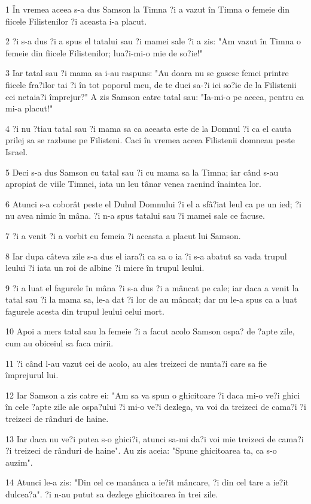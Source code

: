 \par 1 În vremea aceea s-a dus Samson la Timna ?i a vazut în Timna o femeie din fiicele Filistenilor ?i aceasta i-a placut.
\par 2 ?i s-a dus ?i a spus el tatalui sau ?i mamei sale ?i a zis: "Am vazut în Timna o femeie din fiicele Filistenilor; lua?i-mi-o mie de so?ie!"
\par 3 Iar tatal sau ?i mama sa i-au raspuns: "Au doara nu se gasesc femei printre fiicele fra?ilor tai ?i în tot poporul meu, de te duci sa-?i iei so?ie de la Filistenii cei netaia?i împrejur?" A zis Samson catre tatal sau: "Ia-mi-o pe aceea, pentru ca mi-a placut!"
\par 4 ?i nu ?tiau tatal sau ?i mama sa ca aceasta este de la Domnul ?i ca el cauta prilej sa se razbune pe Filisteni. Caci în vremea aceea Filistenii domneau peste Israel.
\par 5 Deci s-a dus Samson cu tatal sau ?i cu mama sa la Timna; iar când s-au apropiat de viile Timnei, iata un leu tânar venea racnind înaintea lor.
\par 6 Atunci s-a coborât peste el Duhul Domnului ?i el a sfâ?iat leul ca pe un ied; ?i nu avea nimic în mâna. ?i n-a spus tatalui sau ?i mamei sale ce facuse.
\par 7 ?i a venit ?i a vorbit cu femeia ?i aceasta a placut lui Samson.
\par 8 Iar dupa câteva zile s-a dus el iara?i ca sa o ia ?i s-a abatut sa vada trupul leului ?i iata un roi de albine ?i miere în trupul leului.
\par 9 ?i a luat el fagurele în mâna ?i s-a dus ?i a mâncat pe cale; iar daca a venit la tatal sau ?i la mama sa, le-a dat ?i lor de au mâncat; dar nu le-a spus ca a luat fagurele acesta din trupul leului celui mort.
\par 10 Apoi a mers tatal sau la femeie ?i a facut acolo Samson ospa? de ?apte zile, cum au obiceiul sa faca mirii.
\par 11 ?i când l-au vazut cei de acolo, au ales treizeci de nunta?i care sa fie împrejurul lui.
\par 12 Iar Samson a zis catre ei: "Am sa va spun o ghicitoare ?i daca mi-o ve?i ghici în cele ?apte zile ale ospa?ului ?i mi-o ve?i dezlega, va voi da treizeci de cama?i ?i treizeci de rânduri de haine.
\par 13 Iar daca nu ve?i putea s-o ghici?i, atunci sa-mi da?i voi mie treizeci de cama?i ?i treizeci de rânduri de haine". Au zis aceia: "Spune ghicitoarea ta, ca s-o auzim".
\par 14 Atunci le-a zis: "Din cel ce manânca a ie?it mâncare, ?i din cel tare a ie?it dulcea?a". ?i n-au putut sa dezlege ghicitoarea în trei zile.
